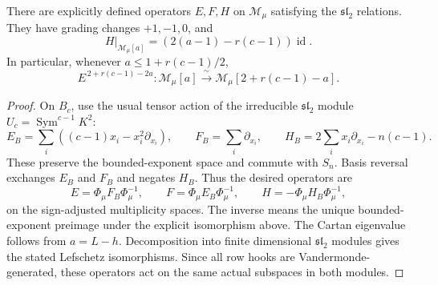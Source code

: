 \begin{corollary}
\label{cor:maximal-hook-lefschetz}
There are explicitly defined operators $E,F,H$ on $\mathcal M_\mu$
satisfying the $\mathfrak{sl}_2$ relations. They have grading changes
$+1,-1,0$, and
\[
 H|_{\mathcal M_\mu[a]}=(2(a-1)-r(c-1))\operatorname{id}.
\]
In particular, whenever $a\le1+r(c-1)/2$,
\[
 E^{\,2+r(c-1)-2a}:\mathcal M_\mu[a]
       \xrightarrow{\ \sim\ }
                    \mathcal M_\mu[2+r(c-1)-a].
\]
\end{corollary}
\begin{proof}
On $B_c$, use the usual tensor action of the irreducible
$\mathfrak{sl}_2$ module $U_c=\operatorname{Sym}^{c-1}K^2$:
\[
 E_B=\sum_i((c-1)x_i-x_i^2\partial_{x_i}),\qquad
 F_B=\sum_i\partial_{x_i},\qquad
 H_B=2\sum_i x_i\partial_{x_i}-n(c-1).
\]
These preserve the bounded-exponent space and commute with $S_n$.
Basis reversal exchanges $E_B$ and $F_B$ and negates $H_B$.
Thus the desired operators are
\[
 E=\Phi_\mu F_B\Phi_\mu^{-1},\qquad
 F=\Phi_\mu E_B\Phi_\mu^{-1},\qquad
 H=-\Phi_\mu H_B\Phi_\mu^{-1},
\]
on the sign-adjusted multiplicity spaces. The inverse means the unique
bounded-exponent preimage under the explicit isomorphism above.
The Cartan eigenvalue follows from $a=L-h$. Decomposition into finite
dimensional $\mathfrak{sl}_2$ modules gives the stated Lefschetz
isomorphisms. Since all row hooks are Vandermonde-generated, these
operators act on the same actual subspaces in both modules.
\end{proof}

